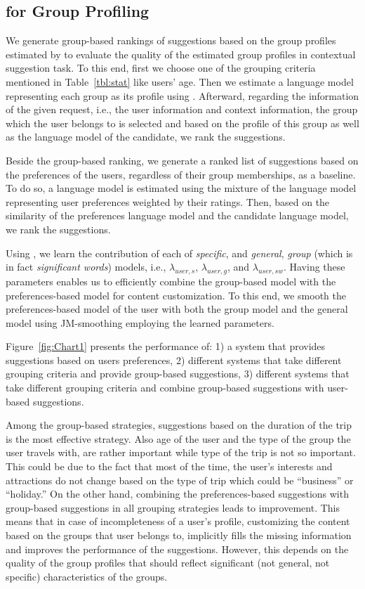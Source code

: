 \subsection{\acswlm for Group Profiling}
\label{sec:groupprofiling}
We generate group-based rankings of suggestions based on the group profiles estimated by \acswlm to evaluate the quality of the estimated group profiles in contextual suggestion task. 
To this end, first we choose one of the grouping criteria mentioned in Table~\ref{tbl:stat} like users' age. Then we estimate a language model representing each group as its profile using \acswlm. Afterward, regarding the information of the given request, i.e., the user information and context information, the group which the user belongs to is selected and based on the profile of this group as well as the language model of the candidate, we rank the suggestions.

Beside the group-based ranking, we generate a ranked list of suggestions based on the preferences of the users, regardless of their group memberships, as a baseline. To do so, a language model is estimated using the mixture of the language model representing user preferences weighted by their ratings. Then, based on the similarity of the preferences language model and the candidate language model, we rank the suggestions.

Using \acswlm, we learn the contribution of each of \emph{specific}, and \emph{general}, \emph{group} (which is in fact \emph{significant words}) models, i.e., $\lambda_{user,s}$, $\lambda_{user,g}$, and $\lambda_{user,sw}$. Having these parameters enables us to efficiently combine the group-based model with the preferences-based model for content customization. To this end, we smooth the preferences-based model of the user with both the group model and the general model using JM-smoothing \citep{Zhai:2001} employing the learned parameters.


Figure~\ref{fig:Chart1} presents the performance of: 1) a system that provides suggestions based on users preferences, 2) different systems that take different grouping criteria and provide group-based suggestions, 3) different systems that take different grouping criteria and combine group-based suggestions with user-based suggestions.

Among the group-based strategies, suggestions based on the duration of the trip is the most effective strategy. Also age of the user and the type of the group the user travels with, are rather important while type of the trip is not so important. This could be due to the fact that most of the time, the user's interests and attractions do not change based on the type of trip which could be ``business'' or ``holiday.''
On the other hand, combining the preferences-based suggestions with group-based suggestions in all grouping strategies leads to improvement. This means that in case of incompleteness of a user's profile, customizing the content based on the groups that user belongs to, implicitly fills the missing information and improves the performance of the suggestions. However, this depends on the quality of the group profiles that should reflect significant (not general, not specific) characteristics of the groups.

